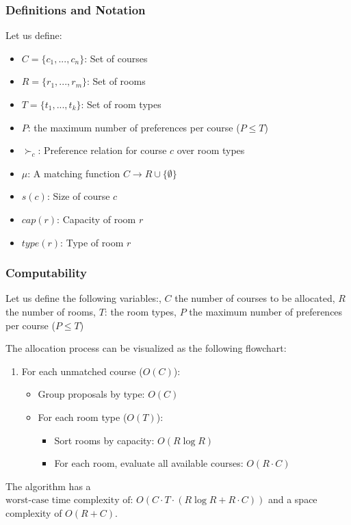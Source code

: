 \documentclass[a4paper, oneside]{article}
\theoremstyle{plain}
\begin{document}
\subsubsection{Definitions and Notation}
Let us define:
\begin{itemize}
	\item $C = \{c_1, ..., c_n\}$: Set of courses
	\item $R = \{r_1, ..., r_m\}$: Set of rooms
	\item $T = \{t_1, ..., t_k\}$: Set of room types
	\item $P$: the maximum number of preferences per course ($P \leq T$)
	\item $\succ_c$: Preference relation for course $c$ over room types
	\item $\mu$: A matching function $C \rightarrow R \cup \{\emptyset\}$
	\item $s(c)$: Size of course $c$
	\item $cap(r)$: Capacity of room $r$
	\item $type(r)$: Type of room $r$
\end{itemize}
\subsubsection{Computability}
Let us define the following variables:, $C$ the number of courses to be allocated, $R$ the number of rooms, $T$: the room types,
$P$ the maximum number of preferences per course ($P \leq T$)

The allocation process can be visualized as the following flowchart:
\begin{enumerate}
	\item For each unmatched course ($O(C)$):
	      \begin{itemize}
		      \item Group proposals by type: $O(C)$
		      \item For each room type ($O(T)$):
		            \begin{itemize}
			            \item Sort rooms by capacity: $O(R \log R)$
			            \item For each room, evaluate all available courses: $O(R \cdot C)$
		            \end{itemize}
	      \end{itemize}
\end{enumerate}

The algorithm has a $\boxed{\text{worst-case time complexity of: } O(C \cdot T \cdot (R \log R + R \cdot C))}$ and a space complexity of $O(R + C)$.
\end{document}
